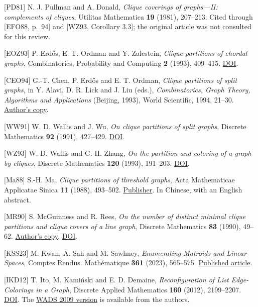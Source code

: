 \documentclass[english,11pt,a4paper]{article}
\begin{document}
{[}PD81{]} N. J. Pullman and A. Donald, \emph{Clique coverings of
graphs---II: complements of cliques}, Utilitas Mathematica \textbf{19}
(1981), 207--213. Cited through {[}EFO88, p.~94{]} and {[}WZ93,
Corollary 3.3{]}; the original article was not consulted for this
review.

{[}EOZ93{]} P. Erdős, E. T. Ordman and Y. Zalcstein, \emph{Clique
partitions of chordal graphs}, Combinatorics, Probability and Computing
\textbf{2} (1993), 409--415.
\href{https://doi.org/10.1017/S0963548300000808}{DOI}.

{[}CEO94{]} G.-T. Chen, P. Erdős and E. T. Ordman, \emph{Clique
partitions of split graphs}, in Y. Alavi, D. R. Lick and J. Liu (eds.),
\emph{Combinatorics, Graph Theory, Algorithms and Applications}
(Beijing, 1993), World Scientific, 1994, 21--30.
\href{http://ordman.net/MathResearch/CEOClique_Parts.pdf}{Author's
copy}.

{[}WW91{]} W. D. Wallis and J. Wu, \emph{On clique partitions of split
graphs}, Discrete Mathematics \textbf{92} (1991), 427--429.
\href{https://doi.org/10.1016/0012-365X(91)90297-F}{DOI}.

{[}WZ93{]} W. D. Wallis and G.-H. Zhang, \emph{On the partition and
coloring of a graph by cliques}, Discrete Mathematics \textbf{120}
(1993), 191--203.
\href{https://doi.org/10.1016/0012-365X(93)90576-F}{DOI}.

{[}Ma88{]} S.-H. Ma, \emph{Clique partitions of threshold graphs}, Acta
Mathematicae Applicatae Sinica \textbf{11} (1988), 493--502.
\href{https://applmath.cjoe.ac.cn/jweb_yysxxb/EN/10.12387/C1988054}{Publisher}.
In Chinese, with an English abstract.

{[}MR90{]} S. McGuinness and R. Rees, \emph{On the number of distinct
minimal clique partitions and clique covers of a line graph}, Discrete
Mathematics \textbf{83} (1990), 49--62.
\href{https://faculty.tru.ca/smcguinness/cliquecoverslinegraph.pdf}{Author's
copy}. \href{https://doi.org/10.1016/0012-365X(90)90220-C}{DOI}.

{[}KSS23{]} M. Kwan, A. Sah and M. Sawhney, \emph{Enumerating Matroids
and Linear Spaces}, Comptes Rendus. Mathématique \textbf{361} (2023),
565--575.
\href{https://numdam.org/articles/10.5802/crmath.423/}{Published
article}.

{[}IKD12{]} T. Ito, M. Kamiński and E. D. Demaine, \emph{Reconfiguration
of List Edge-Colorings in a Graph}, Discrete Applied Mathematics
\textbf{160} (2012), 2199--2207.
\href{https://doi.org/10.1016/j.dam.2012.05.014}{DOI}. The
\href{https://erikdemaine.org/papers/NPReconfiguration_WADS2009/paper.pdf}{WADS
2009 version} is available from the authors.
\end{document}
